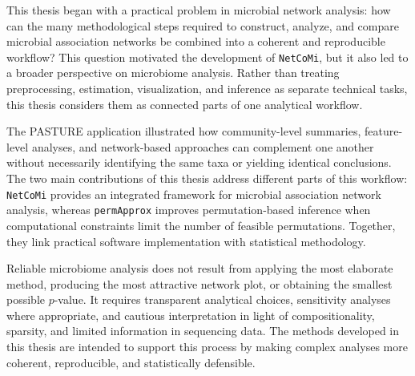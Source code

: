 This thesis began with a practical problem in microbial network analysis: how can the many methodological steps required to construct, analyze, and compare microbial association networks be combined into a coherent and reproducible workflow? This question motivated the development of \texttt{NetCoMi}, but it also led to a broader perspective on microbiome analysis. Rather than treating preprocessing, estimation, visualization, and inference as separate technical tasks, this thesis considers them as connected parts of one analytical workflow.

The PASTURE application illustrated how community-level summaries, feature-level analyses, and network-based approaches can complement one another without necessarily identifying the same taxa or yielding identical conclusions. The two main contributions of this thesis address different parts of this workflow: \texttt{NetCoMi} provides an integrated framework for microbial association network analysis, whereas \texttt{permApprox} improves permutation-based inference when computational constraints limit the number of feasible permutations. Together, they link practical software implementation with statistical methodology.

Reliable microbiome analysis does not result from applying the most elaborate method, producing the most attractive network plot, or obtaining the smallest possible $p$-value. It requires transparent analytical choices, sensitivity analyses where appropriate, and cautious interpretation in light of compositionality, sparsity, and limited information in sequencing data. The methods developed in this thesis are intended to support this process by making complex analyses more coherent, reproducible, and statistically defensible.
